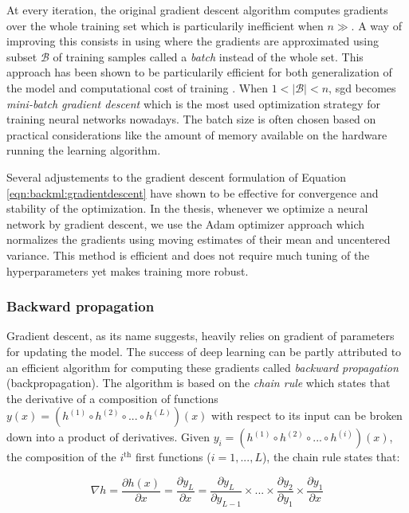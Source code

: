 At every iteration, the original gradient descent algorithm computes gradients over the whole training set which is particularily inefficient when $n \gg$. A way of improving this consists in using  where the gradients are approximated using subset $\mathcal{B}$ of training samples called a \textit{batch} instead of the whole set. This approach has been shown to be particularily efficient for both generalization of the model and computational cost of training \parencite{bottou201113}. When $1 < |\mathcal{B}| < n$, \acrshort{sgd} becomes \textit{mini-batch gradient descent} which is the most used optimization strategy for training neural networks nowadays. The batch size is often chosen based on practical considerations like the amount of memory available on the hardware running the learning algorithm.

Several adjustements to the gradient descent formulation of Equation \ref{eqn:backml:gradientdescent} have shown to be effective for convergence and stability of the optimization. In the thesis, whenever we optimize a neural network by gradient descent, we use the Adam optimizer \parencite{kingma2014adam} approach which normalizes the gradients using moving estimates of their mean and uncentered variance. This method is efficient and does not require much tuning of the hyperparameters yet makes training more robust. 

\subsubsection{Backward propagation}
\label{sssec:backml:backprop}

Gradient descent, as its name suggests, heavily relies on gradient of parameters for updating the model. The success of deep learning can be partly attributed to an efficient algorithm for computing these gradients called \textit{backward propagation} \parencite{rumelhart1986learning} (\aka backpropagation). The algorithm is based on the \textit{chain rule} which states that the derivative of a composition of functions $y(x) = (h^{(1)} \circ h^{(2)} \circ ... \circ h^{(L)})(x)$ with respect to its input can be broken down into a product of derivatives. Given $y_i = (h^{(1)} \circ h^{(2)} \circ ... \circ h^{(i)})(x)$, the composition of the $i^{\text{th}}$ first functions ($i = 1, ..., L$), the chain rule states that:

\begin{equation}
\label{eqn:backml:chainrule}
\nabla h = \dfrac{\partial h(x)}{\partial x} = \dfrac{\partial y_L}{\partial x} = \dfrac{\partial y_L}{\partial y_{L-1}} \times ... \times \dfrac{\partial y_2}{\partial y_1} \times \dfrac{\partial y_1}{\partial x}  
\end{equation}

